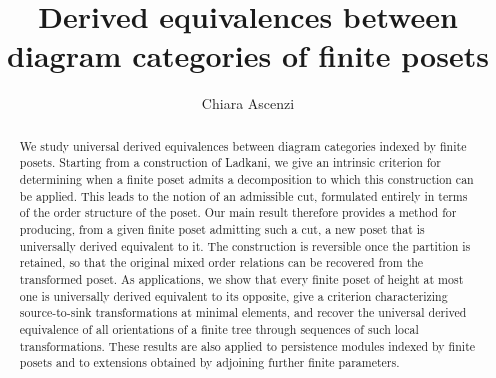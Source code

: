 \documentclass[11pt]{amsart}
\author{Chiara Ascenzi}
\title{Derived equivalences between diagram categories of finite posets}
\begin{document}
%

\restorepagecolor





\begin{abstract}
    We study universal derived equivalences between diagram categories indexed by finite posets. Starting from a construction of Ladkani, we give an intrinsic criterion for determining when a finite poset admits a decomposition to which this construction can be applied. This leads to the notion of an admissible cut, formulated entirely in terms of the order structure of the poset. Our main result therefore provides a method for producing, from a given finite poset admitting such a cut, a new poset that is universally derived equivalent to it. The construction is reversible once the partition is retained, so that the original mixed order relations can be recovered from the transformed poset. As applications, we show that every finite poset of height at most one is universally derived equivalent to its opposite, give a criterion characterizing source-to-sink transformations at minimal elements, and recover the universal derived equivalence of all orientations of a finite tree through sequences of such local transformations. These results are also applied to persistence modules indexed by finite posets and to extensions obtained by adjoining further finite parameters.
    \end{abstract}
    \maketitle







\end{document}
